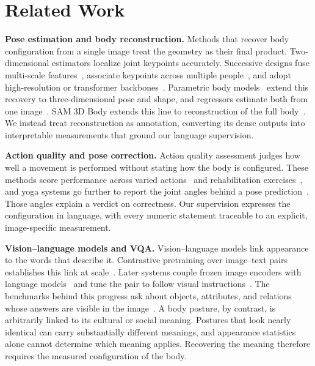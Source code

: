 \section{Related Work}
\label{sec:related}

\noindent\textbf{Pose estimation and body reconstruction.}
Methods that recover body configuration from a single image treat the geometry as their final product.
Two-dimensional estimators localize joint keypoints accurately.
Successive designs fuse multi-scale features~\cite{newell2016stacked,xiao2018simple}, associate keypoints across multiple people~\cite{cao2019openpose}, and adopt high-resolution or transformer backbones~\cite{sun2019deep,xu2022vitpose}.
Parametric body models~\cite{loper2015smpl} extend this recovery to three-dimensional pose and shape, and regressors estimate both from one image~\cite{kanazawa2018end,kolotouros2019spin,li2022cliff,goel2023humans}.
SAM 3D Body extends this line to reconstruction of the full body~\cite{yang2026sam3dbody}.
We instead treat reconstruction as annotation, converting its dense outputs into interpretable measurements that ground our language supervision.

\noindent\textbf{Action quality and pose correction.}
Action quality assessment judges how well a movement is performed without stating how the body is configured.
These methods score performance across varied actions~\cite{lei2019survey,parmar2019action} and rehabilitation exercises~\cite{liao2020deep}, and yoga systems go further to report the joint angles behind a pose prediction~\cite{dittakavi2022posetutor}.
Those angles explain a verdict on correctness.
Our supervision expresses the configuration in language, with every numeric statement traceable to an explicit, image-specific measurement.

\noindent\textbf{Vision--language models and VQA.}
Vision--language models link appearance to the words that describe it.
Contrastive pretraining over image--text pairs establishes this link at scale~\cite{radford2021clip}.
Later systems couple frozen image encoders with language models~\cite{alayrac2022flamingo,li2023blip2} and tune the pair to follow visual instructions~\cite{liu2023visual,dai2023instructblip,wang2024qwen2vl}.
The benchmarks behind this progress ask about objects, attributes, and relations whose answers are visible in the image~\cite{goyal2017vqav2,hudson2019gqa}.
A body posture, by contrast, is arbitrarily linked to its cultural or social meaning.
Postures that look nearly identical can carry substantially different meanings, and appearance statistics alone cannot determine which meaning applies.
Recovering the meaning therefore requires the measured configuration of the body.

